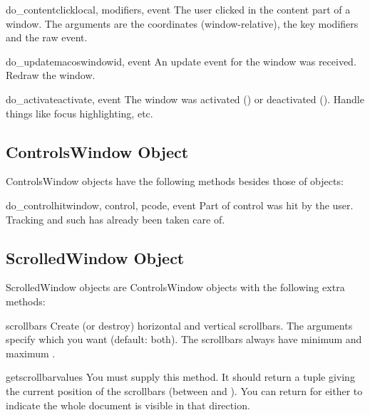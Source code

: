 \begin{funcdesc}{do_contentclick}{local, modifiers, event}
The user clicked in the content part of a window. The arguments are
the coordinates (window-relative), the key modifiers and the raw
event.
\end{funcdesc}

\begin{funcdesc}{do_update}{macoswindowid, event}
An update event for the window was received. Redraw the window.
\end{funcdesc}

\begin{funcdesc}{do_activate}{activate, event}
The window was activated () or deactivated
(). Handle things like focus highlighting, etc.
\end{funcdesc}

\subsection{ControlsWindow Object}
\label{controlswindow-object}

ControlsWindow objects have the following methods besides those of
 objects:


\begin{funcdesc}{do_controlhit}{window, control, pcode, event}
Part  of control  was hit by the
user. Tracking and such has already been taken care of.
\end{funcdesc}

\subsection{ScrolledWindow Object}
\label{scrolledwindow-object}

ScrolledWindow objects are ControlsWindow objects with the following
extra methods:


\begin{funcdesc}{scrollbars}{}
Create (or destroy) horizontal and vertical scrollbars. The arguments
specify which you want (default: both). The scrollbars always have
minimum  and maximum .
\end{funcdesc}

\begin{funcdesc}{getscrollbarvalues}{}
You must supply this method. It should return a tuple  giving the current position of the scrollbars (between
 and ). You can return  for either to
indicate the whole document is visible in that direction.
\end{funcdesc}

